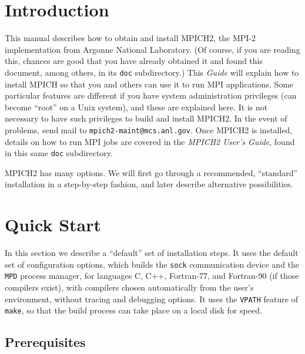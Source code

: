 \documentclass[dvipdfm,11pt]{article}
\begin{document}
\section{Introduction}
\label{sec:intro}
This manual describes how to obtain and install MPICH2, the MPI-2
implementation from Argonne National Laboratory.  (Of course, if you are
reading this, chances are good that you have already obtained it and
found this document, among others, in its \texttt{doc} subdirectory.)
This \emph{Guide} will explain how to install MPICH so that you and others can use it to
run MPI applications.  Some particular features are different
if you have system administration privileges (can become ``root'' on a
Unix system), and these are explained here.  It is not necessary to have
such privileges to build and install MPICH2.  In the event of problems,
send mail to \texttt{mpich2-maint@mcs.anl.gov}.  Once MPICH2 is
installed, details on how to run MPI jobs are covered in the \emph{MPICH2
User's Guide}, found in this same \texttt{doc} subdirectory.

MPICH2 has many options.  We will first go through a recommended,
``standard'' installation in a step-by-step fashion, and later describe
alternative possibilities. 


\section{Quick Start}
\label{sec:quick}

In this section we describe a ``default'' set of installation steps.  It
uses the default set of configuration options, which builds the \texttt{sock}
communication device and the \texttt{MPD} process manager, for 
languages C, C++, Fortran-77, and Fortran-90 (if those compilers exist),
 with compilers chosen automatically from the user's environment,
without tracing and debugging options.  It uses the \texttt{VPATH}
feature of \texttt{make}, so that the build process can take place on
a local disk for speed.

\subsection{Prerequisites}
\label{sec:prerequisites}
\end{document}
